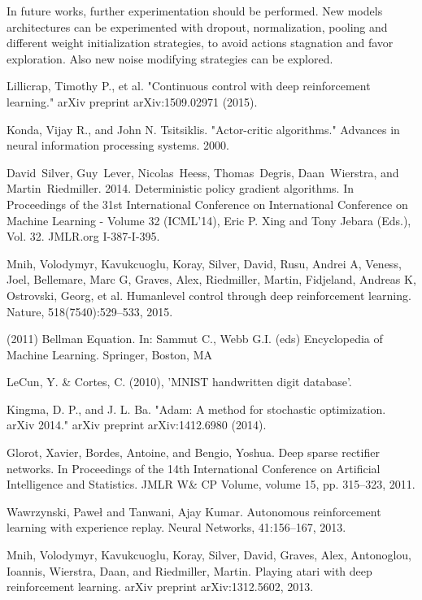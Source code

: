 \documentclass[peerreview,onecolumn]{IEEEtran}
\begin{document}
	In future works, further experimentation should be performed. New models architectures can be experimented with dropout, normalization, pooling and different weight initialization strategies, to avoid actions stagnation and favor exploration. Also new noise modifying strategies can be explored.
 

\begin{thebibliography}{1}

  Lillicrap, Timothy P., et al. "Continuous control with deep reinforcement learning." arXiv preprint arXiv:1509.02971 (2015).
  
  Konda, Vijay R., and John N. Tsitsiklis. "Actor-critic algorithms." Advances in neural information processing systems. 2000.
  
  David~Silver, Guy~Lever, Nicolas~Heess, Thomas~Degris, Daan~Wierstra, and Martin~Riedmiller. 2014. Deterministic policy gradient algorithms. In Proceedings of the 31st International Conference on International Conference on Machine Learning - Volume 32 (ICML'14), Eric P. Xing and Tony Jebara (Eds.), Vol. 32. JMLR.org I-387-I-395.
  
  
  Mnih, Volodymyr, Kavukcuoglu, Koray, Silver, David, Rusu, Andrei A, Veness, Joel, Bellemare,
Marc G, Graves, Alex, Riedmiller, Martin, Fidjeland, Andreas K, Ostrovski, Georg, et al. Humanlevel control through deep reinforcement learning. Nature, 518(7540):529–533, 2015.


(2011) Bellman Equation. In: Sammut C., Webb G.I. (eds) Encyclopedia of Machine Learning. Springer, Boston, MA


	LeCun, Y. \& Cortes, C. (2010), 'MNIST handwritten digit database'.
	
	Kingma, D. P., and J. L. Ba. "Adam: A method for stochastic optimization. arXiv 2014." arXiv preprint arXiv:1412.6980 (2014).
	
	Glorot, Xavier, Bordes, Antoine, and Bengio, Yoshua. Deep sparse rectifier networks. In Proceedings of the 14th International Conference on Artificial Intelligence and Statistics. JMLR W\& CP Volume, volume 15, pp. 315–323, 2011.
	
	
	Wawrzynski, Paweł and Tanwani, Ajay Kumar. Autonomous reinforcement learning with experience replay. Neural Networks, 41:156–167, 2013.
	
	Mnih, Volodymyr, Kavukcuoglu, Koray, Silver, David, Graves, Alex, Antonoglou, Ioannis, Wierstra, Daan, and Riedmiller, Martin. Playing atari with deep reinforcement learning. arXiv preprint arXiv:1312.5602, 2013.
	 
\end{thebibliography}

\end{document}
